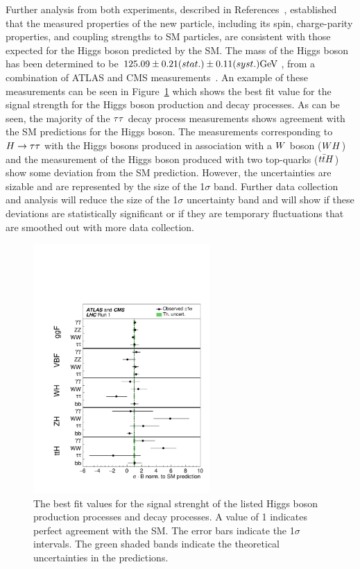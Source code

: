 Further analysis from both experiments, described in References~\cite{Aad:2015gba, Khachatryan:2014jba, 
Chatrchyan:2012jja, Aad:2013xqa, Khachatryan:2014kca,Sirunyan:2017exp},
established that the measured properties of the new particle,
including its spin, charge-parity properties, and coupling strengths to SM particles, 
are consistent with those expected for the Higgs boson predicted by the SM.
The mass of the Higgs boson has been determined to be
$125.09\pm0.21(stat.)\pm0.11(syst.)\mathrm{GeV}$, from a combination of
ATLAS and CMS measurements~\cite{Aad:2015zhl}. An example of these measurements
can be seen in Figure~\ref{fig:run_1_comb_mu} which shows the best fit value for the signal
strength for the Higgs boson production and decay processes. As can be seen, the
majority of the $\tau\tau$ decay process measurements shows agreement with the SM predictions for the Higgs
boson. The measurements corresponding to $H\to\tau\tau$ with the Higgs bosons produced in association
with a $W$ boson ($WH$) and the measurement of the Higgs boson produced with
two top-quarks ($t\bar{t}H$) show some deviation from the SM prediction. However, 
the uncertainties are sizable and are represented by the size of the 1$\sigma$ band. Further data collection and analysis
will reduce the size of the 1$\sigma$ uncertainty band and will show if 
these deviations are statistically significant or if they are 
temporary fluctuations that are smoothed out with more data collection.

\begin{figure}[htbp]
\centering
     \includegraphics[width=0.6\textwidth]{introduction/plots/run_1_comb_mu.pdf}
     \caption{
The best fit values for the signal strenght of the listed Higgs boson production
processes and decay processes. A value of 1 indicates perfect agreement with the SM.
The error bars indicate the 1$\sigma$ intervals. The green shaded bands indicate the
theoretical uncertainties in the predictions.
     }
     \label{fig:run_1_comb_mu}
\end{figure}

